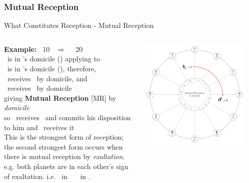 \subsubsection{Mutual Reception}
\begin{frame}[t]{What Constitutes Reception - Mutual Reception}
\begin{columns}[T, onlytextwidth]
\textbf{Example:} \Mars\ 10 \Capricorn\ $\Rightarrow$ \Square\ \Saturn\ 20 \Aries \\
\ul
\vspace{0.25cm}
\Mars\ is in \Saturn's domicile (\Capricorn) applying to \Saturn \\
\Saturn\ is in \Mars's domicile (\Aries), therefore, \\
\Mars\ receives \Saturn\ by domicile, and \\
\Saturn\ receives \Mars\ by domicile \\
\vspace{0.25cm}
giving  \textbf{Mutual Reception} [MR] by \textsl{domicile} \\
so \Mars\ receives \Saturn\ and commits his disposition to him and \Saturn\ receives it\footnotemark[1]\\
\vspace{0.25cm}
This is the strongest form of reception; the second strongest form occurs when there is mutual reception by \textsl{exaltation}. e.g. both planets are in each other's sign of exaltation. i.e. \Venus\ in \Cancer\ \Trine\ \Jupiter\ in \Pisces.


\begin{center}
{\includegraphics[width=0.9\textwidth]{charts/01-MR-by-domicile}} \\
\end{center}

\end{columns}
\end{frame}
